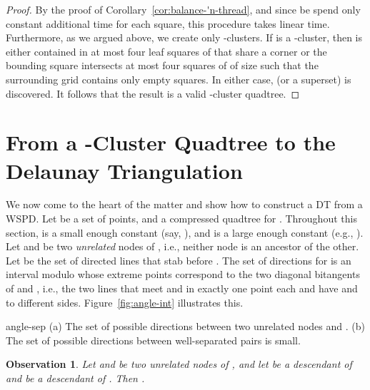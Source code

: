 \documentclass[11pt]{paper}
\newtheorem {observation}[theorem] {Observation}
\begin{document}
\begin{proof}
      By the proof of Corollary~\ref{cor:balance-'n-thread},
      and since be spend only constant additional time for each square,
      this procedure takes linear time. Furthermore, as we argued
      above, we create only -clusters. If 
      is a -cluster, then  is either contained in
      at most four leaf squares of  that share a corner or
      the bounding square  intersects at most four squares of 
       of size  such that the
      surrounding  grid contains only  empty
      squares. In either case,  (or a superset) is discovered.
      It follows that the result is a valid -cluster 
      quadtree.
    \end{proof}






















\section {From a -Cluster Quadtree to the Delaunay Triangulation}
\label{sec:qt->dt}

We now come to the heart of the matter and show how to construct a DT from
a WSPD. Let  be a set of points, and  a
compressed quadtree for . Throughout this section,  is a
small enough constant (say, ), and  is
a large enough constant (e.g., ).
Let  and  be two \emph{unrelated} nodes of , i.e.,
neither node is an ancestor of the other. Let  be the 
set of directed lines that stab  before . 
The set  of directions for 
is an interval modulo 
whose extreme points correspond to
the two diagonal bitangents of  and , i.e., the two lines that
meet  and  in exactly one point each and have  and
 to different sides. 
Figure~\ref {fig:angle-int} illustrates this.

 {angle-sep} {(a) The set of possible directions 
between two unrelated nodes  and . (b) The set of possible directions 
between well-separated pairs is small.}

\begin {observation} \label {obs:directions-contained}
Let  and  be two unrelated nodes of , and let  be a
descendant of  and  be a descendant of .
Then .
\end {observation}
\end{document}
